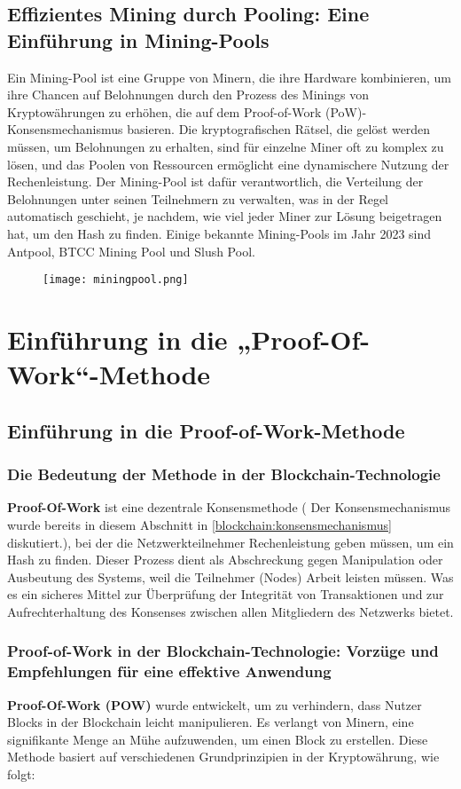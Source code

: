 \section{Effizientes Mining durch Pooling: Eine Einführung in Mining-Pools}
Ein Mining-Pool ist eine Gruppe von Minern, die ihre Hardware kombinieren, um ihre Chancen auf Belohnungen durch den Prozess des Minings von Kryptowährungen zu erhöhen, die auf dem Proof-of-Work (PoW)-Konsensmechanismus basieren. Die kryptografischen Rätsel, die gelöst werden müssen, um Belohnungen zu erhalten, sind für einzelne Miner oft zu komplex zu lösen, und das Poolen von Ressourcen ermöglicht eine dynamischere Nutzung der Rechenleistung.  Der Mining-Pool ist dafür verantwortlich, die Verteilung der Belohnungen unter seinen Teilnehmern zu verwalten, was in der Regel automatisch geschieht, je nachdem, wie viel jeder Miner zur Lösung beigetragen hat, um den Hash zu finden.  Einige bekannte Mining-Pools im Jahr 2023 sind Antpool, BTCC Mining Pool und Slush Pool.

\begin{figure}[H]
	\texttt{[image: miningpool.png]}
	\small{ \cite{second_image} }
\end{figure}




\chapter[Theoretische Seite der Proof-Of-Work-Methode]{Einführung in die „Proof-Of-Work“-Methode}	
\section{Einführung in die Proof-of-Work-Methode}
\subsection{Die Bedeutung der Methode in der Blockchain-Technologie}
\textbf{Proof-Of-Work} ist eine dezentrale Konsensmethode ( Der Konsensmechanismus wurde bereits in diesem Abschnitt in \cref{blockchain:konsensmechanismus} diskutiert.), bei der die Netzwerkteilnehmer Rechenleistung geben müssen, um ein Hash zu finden. Dieser Prozess dient als Abschreckung gegen Manipulation oder Ausbeutung des Systems, weil die Teilnehmer (Nodes) Arbeit leisten müssen. Was es ein sicheres Mittel zur Überprüfung der Integrität von Transaktionen und zur Aufrechterhaltung des Konsenses zwischen allen Mitgliedern des Netzwerks bietet.
\subsection{Proof-of-Work in der Blockchain-Technologie: Vorzüge und Empfehlungen für eine effektive Anwendung}
\textbf{Proof-Of-Work (POW)} wurde entwickelt, um zu verhindern, dass Nutzer Blocks in der Blockchain leicht manipulieren. Es verlangt von Minern, eine signifikante Menge an Mühe aufzuwenden, um einen Block zu erstellen. Diese Methode basiert auf verschiedenen Grundprinzipien in der Kryptowährung, wie folgt:

